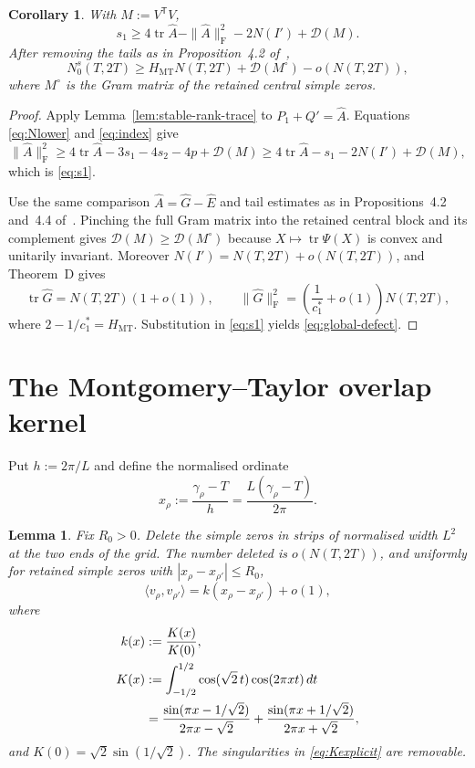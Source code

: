 \documentclass[11pt]{article}
\newtheorem{lemma}[theorem]{Lemma}
\newtheorem{corollary}[theorem]{Corollary}
\DeclareMathOperator{\tr}{tr}
\newcommand{\F}{\mathrm F}
\newcommand{\cD}{\mathcal D}
\begin{document}
\begin{corollary}\label{cor:count}
With $M:=V^{\mathsf T}V$,
\begin{equation}\label{eq:s1}
 s_1\ge4\tr\widehat A-\|\widehat A\|_{\F}^2-2N(I')+\cD(M).
\end{equation}
After removing the tails as in Proposition~4.2 of~\cite{Claude26},
\begin{equation}\label{eq:global-defect}
 N_0^s(T,2T)
 \ge H_{\mathrm{MT}}N(T,2T)+\cD(M^\circ)-o(N(T,2T)),
\end{equation}
where $M^\circ$ is the Gram matrix of the retained central simple zeros.
\end{corollary}

\begin{proof}
Apply Lemma~\ref{lem:stable-rank-trace} to
$P_1+Q'=\widehat A$.  Equations \eqref{eq:Nlower} and \eqref{eq:index}
give
\[
 \|\widehat A\|_{\F}^2
 \ge4\tr\widehat A-3s_1-4s_2-4p+\cD(M)
 \ge4\tr\widehat A-s_1-2N(I')+\cD(M),
\]
which is \eqref{eq:s1}.

Use the same comparison $\widehat A=\widehat G-\widehat E$ and tail
estimates as in Propositions~4.2 and~4.4 of~\cite{Claude26}.  Pinching the
full Gram matrix into the retained central block and its complement gives
$\cD(M)\ge\cD(M^\circ)$ because $X\mapsto\tr\Psi(X)$ is convex and
unitarily invariant.  Moreover $N(I')=N(T,2T)+o(N(T,2T))$, and Theorem~D
gives
\[
 \tr\widehat G=N(T,2T)(1+o(1)),\qquad
 \|\widehat G\|_{\F}^2
 =\left(\frac1{c_1^*}+o(1)\right)N(T,2T),
\]
where $2-1/c_1^*=H_{\mathrm{MT}}$.  Substitution in \eqref{eq:s1}
yields \eqref{eq:global-defect}.
\end{proof}

\clearpage
\section{The Montgomery--Taylor overlap kernel}

Put $h:=2\pi/L$ and define the normalised ordinate
\[
 x_\rho:=\frac{\gamma_\rho-T}{h}
 =\frac{L(\gamma_\rho-T)}{2\pi}.
\]

\begin{lemma}\label{lem:kernel-limit}
Fix $R_0>0$.  Delete the simple zeros in strips of normalised width $L^2$
at the two ends of the grid.  The number deleted is $o(N(T,2T))$, and
uniformly for retained simple zeros with $|x_\rho-x_{\rho'}|\le R_0$,
\begin{equation}\label{eq:kernel-limit}
 \langle v_\rho,v_{\rho'}\rangle
 =k(x_\rho-x_{\rho'})+o(1),
\end{equation}
where
\begin{align}
 k(x)&:=\frac{K(x)}{K(0)},\label{eq:kdef}\\
 K(x)&:=\int_{-1/2}^{1/2}\cos(\sqrt2\,t)\cos(2\pi xt)\,dt\notag\\
 &=\frac{\sin(\pi x-1/\sqrt2)}{2\pi x-\sqrt2}
   +\frac{\sin(\pi x+1/\sqrt2)}{2\pi x+\sqrt2},\label{eq:Kexplicit}
\end{align}
and $K(0)=\sqrt2\sin(1/\sqrt2)$.  The singularities in
\eqref{eq:Kexplicit} are removable.
\end{lemma}
\end{document}
